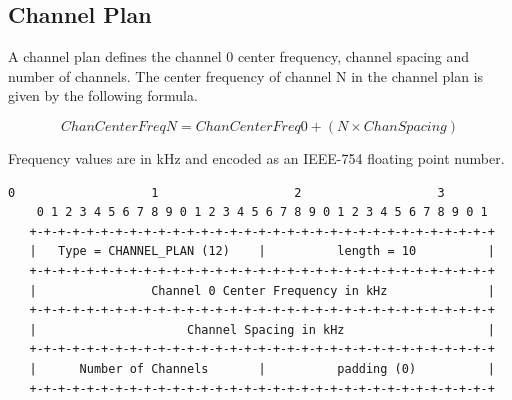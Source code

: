 \documentclass[12pt]{article}
\renewcommand\_{\textunderscore\allowbreak}
\begin{document}
\newpage
\subsection{Channel Plan}
 
A channel plan defines the channel 0 center frequency, channel spacing and
number of channels.  The center frequency of channel N in the channel plan is
given by the following formula.

\[ ChanCenterFreqN = ChanCenterFreq0 + (N \times ChanSpacing) \]
 
Frequency values are in kHz and encoded as an IEEE-754 floating point number.
 
\begin{Verbatim}[samepage=true]
    0                   1                   2                   3
    0 1 2 3 4 5 6 7 8 9 0 1 2 3 4 5 6 7 8 9 0 1 2 3 4 5 6 7 8 9 0 1
   +-+-+-+-+-+-+-+-+-+-+-+-+-+-+-+-+-+-+-+-+-+-+-+-+-+-+-+-+-+-+-+-+
   |   Type = CHANNEL_PLAN (12)    |          length = 10          |
   +-+-+-+-+-+-+-+-+-+-+-+-+-+-+-+-+-+-+-+-+-+-+-+-+-+-+-+-+-+-+-+-+
   |                Channel 0 Center Frequency in kHz              |
   +-+-+-+-+-+-+-+-+-+-+-+-+-+-+-+-+-+-+-+-+-+-+-+-+-+-+-+-+-+-+-+-+
   |                     Channel Spacing in kHz                    |
   +-+-+-+-+-+-+-+-+-+-+-+-+-+-+-+-+-+-+-+-+-+-+-+-+-+-+-+-+-+-+-+-+
   |      Number of Channels       |          padding (0)          |
   +-+-+-+-+-+-+-+-+-+-+-+-+-+-+-+-+-+-+-+-+-+-+-+-+-+-+-+-+-+-+-+-+
\end{Verbatim}

\newpage
\end{document}
